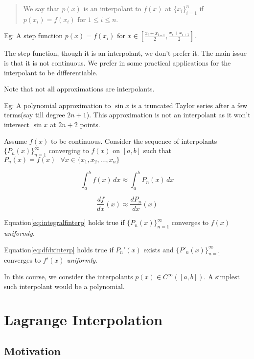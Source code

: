 \documentclass[
]{book}
\begin{document}
\begin{quote}
We say that \(p(x)\) is an interpolant to \(f(x)\) at \(\{x_i\}_{i=1}^n\) if \(p(x_i)= f(x_i)\) for \(1\le i\le n\).
\end{quote}

Eg: A step function \(p(x) = f(x_i)\) for \(x\in \left[ \frac{x_i+x_{i-1}}{2}, \frac{x_i+x_{i+1}}{2} \right]\).

The step function, though it is an interpolant, we don't prefer it. The main issue is that it is not continuous. We prefer in some practical applications for the interpolant to be differentiable.

Note that not all approximations are interpolants.

Eg: A polynomial approximation to \(\sin x\) is a truncated Taylor series after a few terms(say till degree \(2n+1\)). This approximation is not an interpolant as it won't intersect \(\sin x\) at \(2n+2\) points.

Assume \(f(x)\) to be continuous. Consider the sequence of interpolants \(\{P_n(x)\}_{n=1}^{\infty}\) converging to \(f(x)\) on \([a,b]\) such that \(P_n(x)=f(x) \ \  \ \forall x\in \{x_1,x_2,\dots,x_n \}\)

\begin{equation}
\label{eq:integralfinterp}
\int_a^b f(x) \, dx \approx \int_a^b P_n(x) \, dx 
\end{equation}

\begin{equation}
\label{eq:dfdxinterp}
\frac{df}{dx}(x) \approx \frac{dP_n}{dx}(x)
\end{equation}

Equation\eqref{eq:integralfinterp} holds true if \(\{P_n(x)\}_{n=1}^{\infty}\) converges to \(f(x)\) \emph{uniformly}.

Equation\eqref{eq:dfdxinterp} holds true if \(P_n'(x)\) exists and \(\{P'_n(x)\}_{n=1}^{\infty}\) converges to \(f'(x)\) \emph{uniformly}.

In this course, we consider the interpolants \(p(x) \in C^{\infty}([a,b])\). A simplest such interpolant would be a polynomial.

\hypertarget{lagrange-interpolation}{%
\section{Lagrange Interpolation}\label{lagrange-interpolation}}

\hypertarget{motivation}{%
\subsection{Motivation}\label{motivation}}
\end{document}
